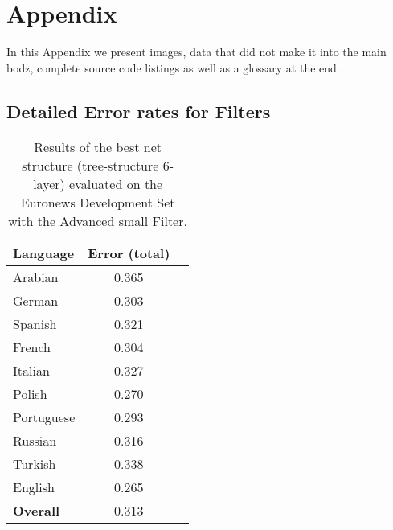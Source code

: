 


\chapter{Appendix}
\label{chap:appendix}
In this Appendix we present images, data that did not make it into the main bodz, complete source code listings as well as a glossary at the end.

\section{Detailed Error rates for Filters}
\label{app:res:lid}
\begin{table}[!htbp]
\centering
\caption{Results of the best net structure (tree-structure 6-layer) evaluated on the Euronews Development Set with the Advanced small Filter.}
\label{tab:advanced}
\begin{tabular}{| l | c | r | }
	\hline
	\textbf{Language} & \textbf{Error (total)}  \\
	\hline
	Arabian & 0.365  \\
	German & 0.303  \\
	Spanish & 0.321 \\ 
	French & 0.304 \\
	Italian & 0.327  \\
	Polish & 0.270 \\
	Portuguese& 0.293  \\
	Russian&  0.316 \\
	Turkish&  0.338 \\
	English&  0.265 \\
	\hline
	\textbf{Overall} & 0.313 \\
	\hline
\end{tabular}
\end{table}


